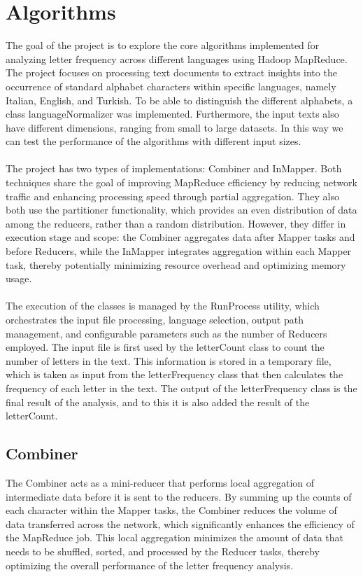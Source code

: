 \chapter{Algorithms}


The goal of the project is to explore the core algorithms implemented for analyzing letter frequency across different languages using Hadoop MapReduce. 
The project focuses on processing text documents to extract insights into the occurrence of standard alphabet characters within specific languages, namely Italian, English, and Turkish. 
To be able to distinguish the different alphabets, a class languageNormalizer was implemented. Furthermore, the input texts also have different
dimensions, ranging from small to large datasets. In this way we can test the performance of the algorithms with different input sizes. \\ \\
The project has two types of implementations: Combiner and InMapper. Both techniques share the goal of improving MapReduce efficiency by
reducing network traffic and enhancing processing speed through partial aggregation. They also both use the partitioner functionality,
which provides an even distribution of data among the reducers, rather than a random distribution. However, they differ in execution
stage and scope: the Combiner aggregates data after Mapper tasks and before Reducers, while the InMapper integrates aggregation within
each Mapper task, thereby potentially minimizing resource overhead and optimizing memory usage. \\ \\
The execution of the classes is managed by the RunProcess utility, which orchestrates the input file processing, language selection,
output path management, and configurable parameters such as the number of Reducers employed. The input file is first used by the
letterCount class to count the number of letters in the text. This information is stored in a temporary file, which is taken as input
from the letterFrequency class that then calculates the frequency of each letter in the text. The output of the letterFrequency class
is the final result of the analysis, and to this it is also added the result of the letterCount.

\newpage

\section{Combiner}

The Combiner acts as a mini-reducer that performs local aggregation of intermediate data before it is sent to the reducers.
By summing up the counts of each character within the Mapper tasks, the Combiner reduces the volume of data transferred
across the network, which significantly enhances the efficiency of the MapReduce job. This local aggregation minimizes
the amount of data that needs to be shuffled, sorted, and processed by the Reducer tasks, thereby optimizing the overall
performance of the letter frequency analysis.

